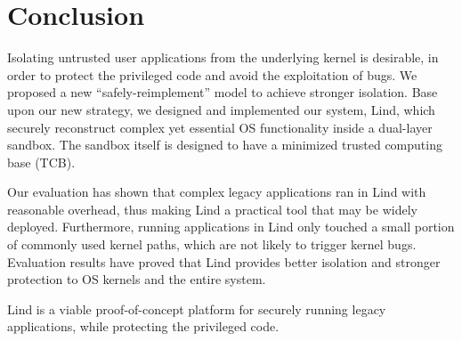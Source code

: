 \section{Conclusion}
\label{sec.conclusion}


\par
Isolating untrusted user applications from the underlying kernel is desirable, in order to protect the privileged code and avoid the exploitation of bugs. We proposed a new ``safely-reimplement'' model to achieve stronger isolation. Base upon our new strategy, we designed and implemented our system, Lind, which securely reconstruct complex yet essential OS functionality inside a dual-layer sandbox. The sandbox itself is designed to have a minimized trusted computing base (TCB). 

\par
Our evaluation has shown that complex legacy applications ran in Lind with reasonable overhead, thus making Lind a practical tool that may be widely deployed. Furthermore, running applications in Lind only touched a small portion of commonly used kernel paths, which are not likely to trigger kernel bugs. Evaluation results have proved that Lind provides better isolation and stronger protection to OS kernels and the entire system.  

\par
Lind is a viable proof-of-concept platform for securely running legacy applications, while protecting the privileged code.
 